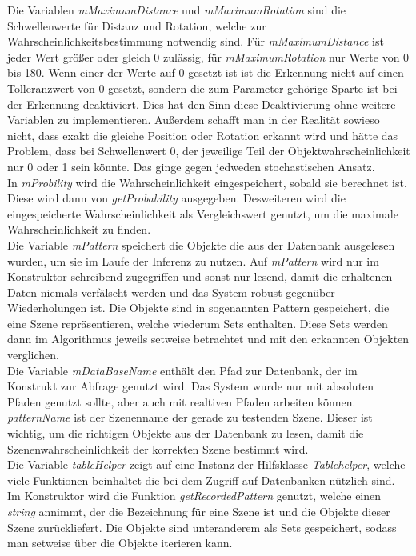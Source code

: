 Die Variablen \textit{mMaximumDistance} und \textit{mMaximumRotation} sind die Schwellenwerte für Distanz und Rotation, welche zur Wahrscheinlichkeitsbestimmung notwendig sind. Für \textit{mMaximumDistance} ist jeder Wert größer oder gleich 0 zulässig, für \textit{mMaximumRotation} nur Werte von 0 bis 180. Wenn einer der Werte auf 0 gesetzt ist ist die Erkennung nicht auf einen Tolleranzwert von 0 gesetzt, sondern die zum Parameter gehörige Sparte ist bei der Erkennung deaktiviert. Dies hat den Sinn diese Deaktivierung ohne weitere Variablen zu implementieren. Außerdem schafft man in der Realität sowieso nicht, dass exakt die gleiche Position oder Rotation erkannt wird und hätte das Problem, dass bei Schwellenwert 0, der jeweilige Teil der Objektwahrscheinlichkeit nur 0 oder 1 sein könnte. Das ginge gegen jedweden stochastischen Ansatz.\smallskip\\
In \textit{mProbility} wird die Wahrscheinlichkeit eingespeichert, sobald sie berechnet ist. Diese wird dann von \textit{getProbability} ausgegeben. Desweiteren wird die eingespeicherte Wahrscheinlichkeit als Vergleichswert genutzt, um die maximale Wahrscheinlichkeit zu finden.\smallskip\\
Die Variable \textit{mPattern} speichert die Objekte die aus der Datenbank ausgelesen wurden, um sie im Laufe der Inferenz zu nutzen. Auf \textit{mPattern} wird nur im Konstruktor schreibend zugegriffen und sonst nur lesend, damit die erhaltenen Daten niemals verfälscht werden und das System robust gegenüber Wiederholungen ist. Die Objekte sind in sogenannten Pattern gespeichert, die eine Szene repräsentieren, welche wiederum Sets enthalten. Diese Sets werden dann im Algorithmus jeweils setweise betrachtet und mit den erkannten Objekten verglichen.\smallskip\\
Die Variable \textit{mDataBaseName} enthält den Pfad zur Datenbank, der im Konstrukt zur Abfrage genutzt wird. Das System wurde nur mit absoluten Pfaden genutzt sollte, aber auch mit realtiven Pfaden arbeiten können.\smallskip\\
\textit{patternName} ist der Szenenname der gerade zu testenden Szene. Dieser ist wichtig, um die richtigen Objekte aus der Datenbank zu lesen, damit die Szenenwahrscheinlichkeit der korrekten Szene bestimmt wird.\smallskip\\
Die Variable \textit{tableHelper} zeigt auf eine Instanz der Hilfsklasse \textit{Tablehelper}, welche viele Funktionen beinhaltet die bei dem Zugriff auf Datenbanken nützlich sind. Im Konstruktor wird die Funktion \textit{getRecordedPattern} genutzt, welche einen \textit{string} annimmt, der die Bezeichnung für eine Szene ist und die Objekte dieser Szene zurückliefert. Die Objekte sind unteranderem als Sets gespeichert, sodass man setweise über die Objekte iterieren kann.\smallskip\\
